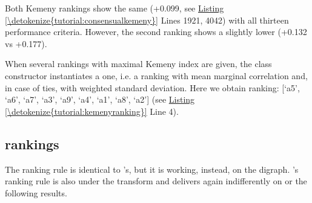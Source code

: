 \documentclass[a4paper,12pt,english]{sphinxhowto}
\begin{document}
Both Kemeny rankings show the same  (+0.099, see \hyperref[\detokenize{tutorial:consensualkemeny}]{Listing \ref{\detokenize{tutorial:consensualkemeny}}} Lines 19\sphinxhyphen{}21, 40\sphinxhyphen{}42) with all thirteen performance criteria. However, the second ranking shows a slightly lower  (+0.132 vs +0.177).

When several rankings with maximal Kemeny index are given, the  class constructor instantiates a  one, i.e. a ranking with  mean marginal correlation and, in case of ties, with  weighted standard deviation. Here we obtain ranking: {[}‘a5’, ‘a6’, ‘a7’, ‘a3’, ‘a9’, ‘a4’, ‘a1’, ‘a8’, ‘a2’{]} (see \hyperref[\detokenize{tutorial:kemenyranking}]{Listing \ref{\detokenize{tutorial:kemenyranking}}} Line 4).


\subsection{ rankings}
\label{\detokenize{tutorial:slater-rankings}}
The  ranking rule is identical to ’s, but it is working, instead, on the  digraph. ’s ranking rule is also  under the  transform and delivers again indifferently on  or  the following results.
\def\sphinxLiteralBlockLabel{\label{\detokenize{tutorial:slaterranking}}}
\begin{sphinxVerbatim}[commandchars=\\\{\},numbers=left,firstnumber=1,stepnumber=1]
   
  
  
\end{sphinxVerbatim}
\end{document}
